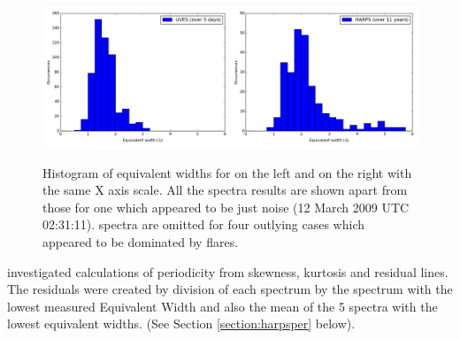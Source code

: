 \begin{figure}[!htbp]
\begin{center}
\includegraphics[scale=0.25]{Figures/proxhists.png} \\
\end{center}
\caption{Histogram of equivalent widths for {\uves} on the left and {\harps} on the right with the same X axis
  scale. All the {\uves} spectra results are shown apart from those for one which appeared to be just noise (12
  March 2009 UTC 02:31:11). {\harps} spectra are omitted for four outlying cases which appeared to be dominated by
  flares.}
 \protect\label{fig:proxhists}
\end{figure}

{\FirstP} investigated calculations of periodicity from skewness, kurtosis and residual {\ha} lines. The residuals were
created by division of each spectrum by the spectrum with the lowest measured Equivalent Width and also the mean of the
5 spectra with the lowest equivalent widths. (See Section \ref{section:harpsper} below).



